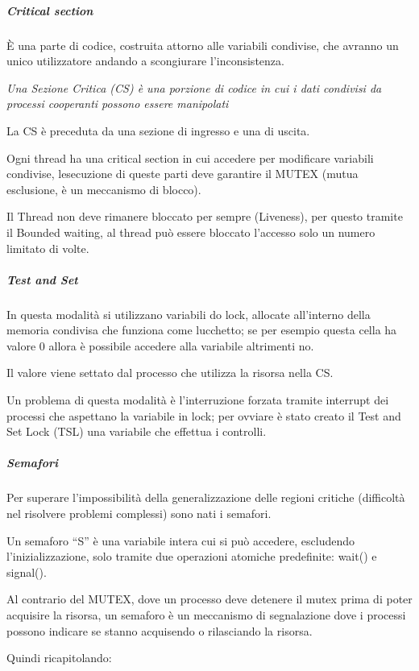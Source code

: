 \subparagraph{\texorpdfstring{\emph{Critical
section}}{Critical section}}\label{critical-section}

È una parte di codice, costruita attorno alle variabili condivise, che
avranno un unico utilizzatore andando a scongiurare l'inconsistenza.

\emph{Una Sezione Critica (CS) è una porzione di codice in cui i dati
condivisi da processi cooperanti possono essere manipolati}

La CS è preceduta da una sezione di ingresso e una di uscita.

Ogni thread ha una critical section in cui accedere per modificare
variabili condivise, l\textquotesingle esecuzione di queste parti deve
garantire il MUTEX (mutua esclusione, è un meccanismo di blocco).

Il Thread non deve rimanere bloccato per sempre (Liveness), per questo
tramite il Bounded waiting, al thread può essere bloccato l'accesso solo
un numero limitato di volte.

\subparagraph{\texorpdfstring{\emph{Test and
Set}}{Test and Set}}\label{test-and-set}

In questa modalità si utilizzano variabili do lock, allocate all'interno
della memoria condivisa che funziona come lucchetto; se per esempio
questa cella ha valore 0 allora è possibile accedere alla variabile
altrimenti no.

Il valore viene settato dal processo che utilizza la risorsa nella CS.

Un problema di questa modalità è l'interruzione forzata tramite
interrupt dei processi che aspettano la variabile in lock; per ovviare è
stato creato il Test and Set Lock (TSL) una variabile che effettua i
controlli.

\subparagraph{\texorpdfstring{\emph{Semafori}}{Semafori}}\label{semafori}

Per superare l'impossibilità della generalizzazione delle regioni
critiche (difficoltà nel risolvere problemi complessi) sono nati i
semafori.

Un semaforo ``S'' è una variabile intera cui si può accedere, escludendo
l'inizializzazione, solo tramite due operazioni atomiche predefinite:
wait() e signal().

Al contrario del MUTEX, dove un processo deve detenere il mutex prima di
poter acquisire la risorsa, un semaforo è un meccanismo di segnalazione
dove i processi possono indicare se stanno acquisendo o rilasciando la
risorsa.

Quindi ricapitolando:

